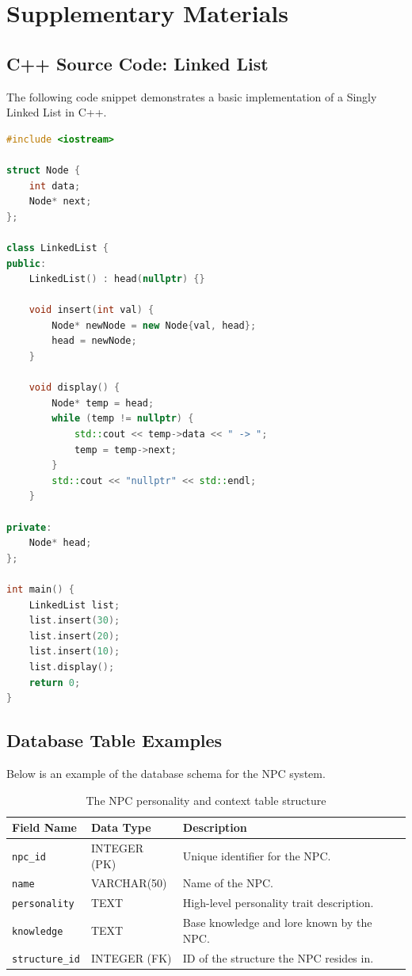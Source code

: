 \section{Supplementary Materials}

\subsection{C++ Source Code: Linked List}
The following code snippet demonstrates a basic implementation of a Singly Linked List in C++.

\begin{lstlisting}[language=C++, caption={Basic implementation of a Singly Linked List in C++}]
#include <iostream>

struct Node {
    int data;
    Node* next;
};

class LinkedList {
public:
    LinkedList() : head(nullptr) {}

    void insert(int val) {
        Node* newNode = new Node{val, head};
        head = newNode;
    }

    void display() {
        Node* temp = head;
        while (temp != nullptr) {
            std::cout << temp->data << " -> ";
            temp = temp->next;
        }
        std::cout << "nullptr" << std::endl;
    }

private:
    Node* head;
};

int main() {
    LinkedList list;
    list.insert(30);
    list.insert(20);
    list.insert(10);
    list.display();
    return 0;
}
\end{lstlisting}

\subsection{Database Table Examples}
Below is an example of the database schema for the NPC system.

\begin{table}[H]
\centering
\caption{The NPC personality and context table structure}
\label{tab:db_npc_table}
\begin{tabularx}{\textwidth}{|l|l|X|}
\hline
\textbf{Field Name} & \textbf{Data Type} & \textbf{Description} \\ \hline
\texttt{npc\_id} & INTEGER (PK) & Unique identifier for the NPC. \\ \hline
\texttt{name} & VARCHAR(50) & Name of the NPC. \\ \hline
\texttt{personality} & TEXT & High-level personality trait description. \\ \hline
\texttt{knowledge} & TEXT & Base knowledge and lore known by the NPC. \\ \hline
\texttt{structure\_id} & INTEGER (FK) & ID of the structure the NPC resides in. \\ \hline
\end{tabularx}
\end{table}


